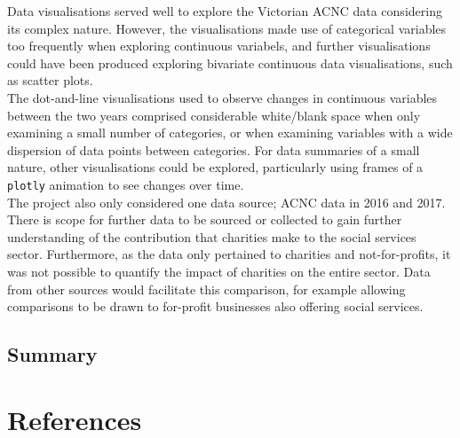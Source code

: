 \documentclass[
  11pt,
]{article}
\begin{document}
Data visualisations served well to explore the Victorian ACNC data considering its complex nature. However, the visualisations made use of categorical variables too frequently when exploring continuous variabels, and further visualisations could have been produced exploring bivariate continuous data visualisations, such as scatter plots.\\
The dot-and-line visualisations used to observe changes in continuous variables between the two years comprised considerable white/blank space when only examining a small number of categories, or when examining variables with a wide dispersion of data points between categories. For data summaries of a small nature, other visualisations could be explored, particularly using frames of a \texttt{plotly} animation to see changes over time.\\
The project also only considered one data source; ACNC data in 2016 and 2017. There is scope for further data to be sourced or collected to gain further understanding of the contribution that charities make to the social services sector. Furthermore, as the data only pertained to charities and not-for-profits, it was not possible to quantify the impact of charities on the entire sector. Data from other sources would facilitate this comparison, for example allowing comparisons to be drawn to for-profit businesses also offering social services.

\hypertarget{summary}{%
\subsection{Summary}\label{summary}}

\newpage
{}
\onecolumn

\hypertarget{references}{%
\section{References}\label{references}}

\fontsize{11}{14}
\end{document}

